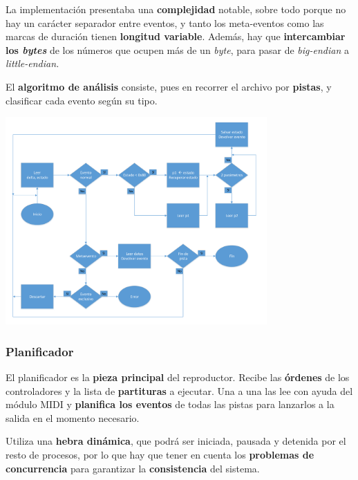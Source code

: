 \documentclass[10pt,a4paper]{article}
\begin{document}
	La implementación presentaba una \textbf{complejidad} notable, sobre todo porque no hay un carácter separador entre eventos, y tanto los meta-eventos como las marcas de duración tienen \textbf{longitud variable}. Además, hay que \textbf{intercambiar los \textit{bytes}} de los números que ocupen más de un \textit{byte}, para pasar de \textit{big-endian} a \textit{little-endian.}
	
	El \textbf{algoritmo de análisis} consiste, pues en recorrer el archivo por \textbf{pistas}, y clasificar cada evento según su tipo.
	
	\begin{center}
		\includegraphics[width=0.75\textwidth]{images/flujo_parser}
	\end{center}
	
	
	\subsubsection*{Planificador}
	
	El planificador es la \textbf{pieza principal} del reproductor. Recibe las \textbf{órdenes} de los controladores y la lista de \textbf{partituras} a ejecutar. Una a una las lee con ayuda del módulo MIDI y \textbf{planifica los eventos} de todas las pistas para lanzarlos a la salida en el momento necesario.
	
	Utiliza una \textbf{hebra dinámica}, que podrá ser iniciada, pausada y detenida por el resto de procesos, por lo que hay que tener en cuenta los \textbf{problemas de concurrencia} para garantizar la \textbf{consistencia} del sistema.
	
\end{document}
